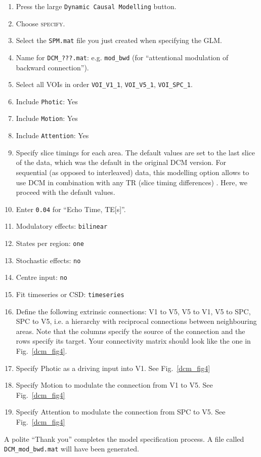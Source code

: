 \begin{enumerate}
\item Press the large \texttt{Dynamic Causal Modelling} button.
\item Choose \textsc{specify}.
\item Select the \texttt{SPM.mat} file you just created when specifying the GLM.
\item Name for \texttt{DCM\_???.mat}:  e.g. \texttt{mod\_bwd} (for ``attentional modulation of backward connection'').
\item Select all VOIs in order \texttt{VOI\_V1\_1}, \texttt{VOI\_V5\_1}, \texttt{VOI\_SPC\_1}.
\item Include \texttt{Photic}: Yes
\item Include \texttt{Motion}: Yes
\item Include \texttt{Attention}: Yes
\item Specify slice timings for each area. The default values are set to the last slice of the data, which was the default in the original DCM version. For sequential (as opposed to interleaved) data, this modelling option allows to use DCM in combination with any TR (slice timing differences) \cite{sjk_dcm_slicetiming}. Here, we proceed with the default values.
\item Enter \texttt{0.04} for ``Echo Time, TE[s]''.
\item Modulatory effects: \texttt{bilinear}
\item States per region: \texttt{one}
\item Stochastic effects: \texttt{no}
\item Centre input: \texttt{no}
\item Fit timeseries or CSD: \texttt{timeseries}
\item Define the following extrinsic connections: V1 to V5, V5 to V1, V5 to SPC, SPC to V5, i.e. a hierarchy with reciprocal connections between neighbouring areas. Note that the columns specify the source of the connection and the rows specify its target. Your connectivity matrix should look like the one in Fig.~\ref{dcm_fig4}.
\item Specify Photic as a driving input into V1.  See Fig.~\ref{dcm_fig4}
\item Specify Motion to modulate the connection from V1 to V5.  See Fig.~\ref{dcm_fig4}
\item Specify Attention to modulate the connection from SPC to V5.  See Fig.~\ref{dcm_fig4}
\end{enumerate}
A polite ``Thank you'' completes the model specification process. A file called \texttt{DCM\_mod\_bwd.mat} will have been generated.

